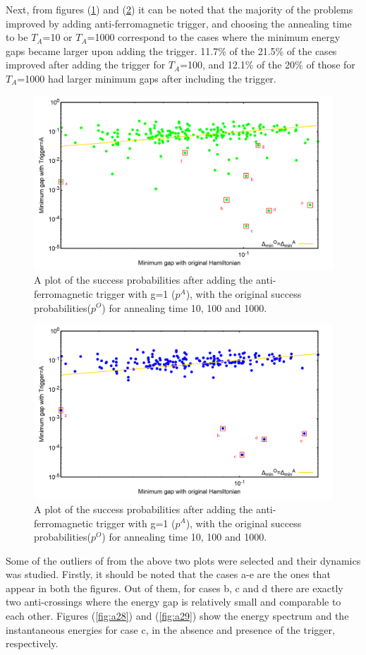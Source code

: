 \documentclass[12]{article}
\begin{document}
Next, from figures (\ref{fig:a26}) and (\ref{fig:a27}) it can be noted that the majority of the problems improved by adding anti-ferromagnetic trigger, and choosing the annealing time to be $T_A$=10 or $T_A$=1000 correspond to the cases where the minimum energy gaps became larger upon adding the trigger. 11.7\% of the   21.5\% of the cases improved after adding the trigger for $T_A$=100, and 12.1\% of the 20\% of those for $T_A$=1000 had larger minimum gaps after including the trigger.
\begin{figure}[H]
\centering 
\includegraphics[scale=0.43]{selected_T100_g1.png}
\caption{A plot of the success probabilities after adding the anti-ferromagnetic trigger with g=1 ($p^A$), with the original success probabilities($p^O$) for annealing time 10, 100 and 1000.}
\label{fig:a26}
\end{figure}
\begin{figure}[H]
\centering 
\includegraphics[scale=0.43]{selected_T1000_g1.png}
\caption{A plot of the success probabilities after adding the anti-ferromagnetic trigger with g=1 ($p^A$), with the original success probabilities($p^O$) for annealing time 10, 100 and 1000.}
\label{fig:a27}
\end{figure}
Some of the outliers of from the above two plots were selected and their dynamics was studied. Firstly, it should be noted that the cases a-e are the ones that appear in both the figures. Out of them, for cases b, c and d there are exactly two anti-crossings where the energy gap is relatively small and comparable to each other. Figures (\ref{fig:a28}) and (\ref{fig:a29}) show the energy spectrum and the instantaneous energies for case c, in the absence and presence of the trigger, respectively.
\end{document}
